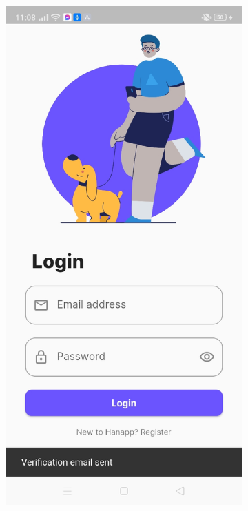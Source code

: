 \begin{figure}[!h]
\begin{subfigure}[c]{0.30\linewidth}
    \end{subfigure}
    \centering
    \begin{subfigure}[c]{0.30\linewidth}
        \centering
        \includegraphics[scale=0.15]{figures/Chapter4/Main/Verification-2.jpg}

\end{subfigure}
\end{figure}
